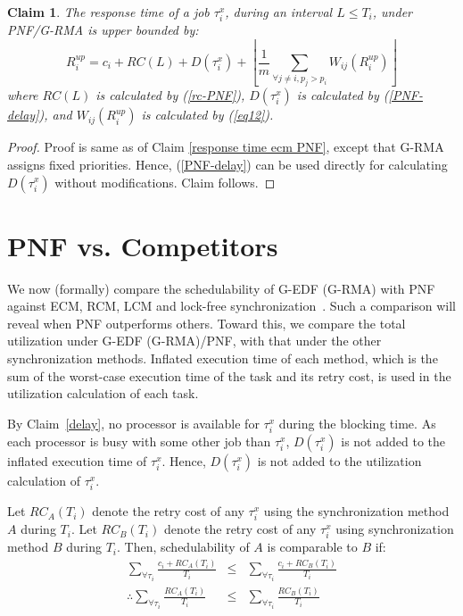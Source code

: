 \documentclass[12pt,english]{report}
\newtheorem{clm}{Claim}
\newtheorem{proof}{Proof}
\begin{document}
\begin{clm}\label{response rcm PNF}
The response time of a job $\tau_{i}^{x}$, during an interval $L\le T_{i}$, under PNF/G-RMA is upper bounded by: 
\begin{equation}
R_{i}^{up}=c_{i}+RC(L)+D(\tau_{i}^{x})+\left\lfloor \frac{1}{m}\sum_{\forall j\ne i,p_j>p_i}W_{ij}(R_{i}^{up})\right\rfloor 
\end{equation}
where $RC(L)$ is calculated by (\ref{rc-PNF}), $D(\tau_{i}^{x})$
is calculated by (\ref{PNF-delay}), and $W_{ij}(R_{i}^{up})$
is calculated by (\ref{eq12}).
\end{clm}
\begin{proof}\normalfont
Proof is same as of Claim \ref{response time ecm PNF}, 
except that G-RMA assigns fixed priorities. Hence, (\ref{PNF-delay}) can be used directly for calculating $D(\tau_{i}^{x})$ without modifications. Claim follows.
\end{proof}


\section{PNF vs. Competitors}
\label{sec:pnf-sched-comparison}

We now (formally) compare the schedulability of G-EDF (G-RMA) with PNF against ECM, RCM, LCM and lock-free synchronization~\cite{stmconcurrencycontrol:emsoft11,lcmdac2012, key-5}. 
Such a comparison will reveal when PNF outperforms  others. 
Toward this, we compare the total utilization under G-EDF (G-RMA)/PNF,  with that under the other synchronization methods.
Inflated execution time of each method, which is the sum of the worst-case execution time of the task and its retry cost, is used in the utilization calculation of each task.

By Claim~\ref{delay}, no processor is available for $\tau_i^x$ during the blocking time. As each processor is busy with some other job than $\tau_i^x$, $D(\tau_i^x)$ is not added to the inflated execution time of $\tau_i^x$. Hence, $D(\tau_i^x)$ is not added to the utilization calculation of $\tau_i^x$.

Let $RC_{A}(T_{i})$ denote the retry cost of any $\tau_i^x$ using the synchronization method $A$ during $T_i$. Let $RC_{B}(T_{i})$ denote the  retry cost of any $\tau_i^x$ using synchronization method $B$ during $T_i$. Then, schedulability of $A$ is comparable to $B$ if:
\begin{eqnarray}
\sum_{\forall\tau_{i}}\frac{c_{i}+RC_{A}(T_{i})}{T_{i}} & \le & \sum_{\forall\tau_{i}}\frac{c_{i}+RC_{B}(T_{i})}{T_{i}}\nonumber \\
\therefore\sum_{\forall\tau_{i}}\frac{RC_{A}(T_{i})}{T_{i}} & \le & \sum_{\forall\tau_{i}}\frac{RC_{B}(T_{i})}{T_{i}}\label{utilization comparison}
\end{eqnarray}
\end{document}
